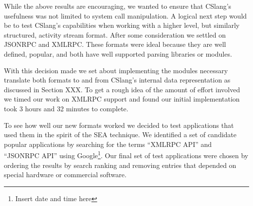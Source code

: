 While the above results are encouraging, we wanted to ensure that CSlang's
usefulness was not limited to system call manipulation.
A logical next step would be to test CSlang's capabilities when working
with a higher level, but similarly structured, activity stream format.
After some consideration we settled on JSONRPC and XMLRPC.  These formats
were ideal because they are well defined, popular, and both have well
supported parsing libraries or modules.

With this decision made we set about implementing the modules necessary
translate both formats to and from CSlang's internal data representation as
discussed in Section XXX.  To get a rough idea of the amount of effort
involved we timed our work on XMLRPC support and found our initial
implementation took 3 hours and 32 minutes to complete.

To see how well our new formats worked we decided to test applications that
used them in the spirit of the SEA technique.  We identified a set of
candidate popular applications by searching for the terms ``XMLRPC API''
and ``JSONRPC API'' using Google\footnote{Insert date and time here}.  Our
final set of test applications were chosen by ordering the results by search
ranking and removing entries that depended on special hardware or
commercial software.







